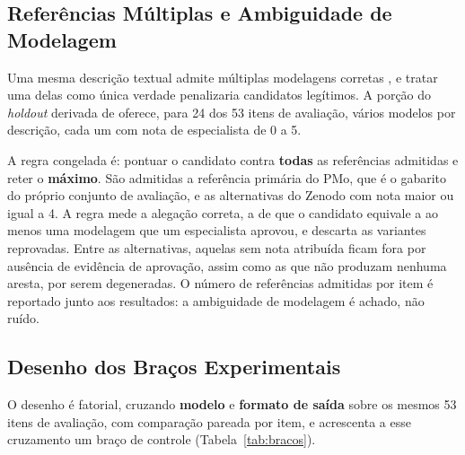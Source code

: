 \subsection{Referências Múltiplas e Ambiguidade de Modelagem}
\label{subsec:multi-referencia}

Uma mesma descrição textual admite múltiplas modelagens corretas \cite{vanderaa2018challenges}, e tratar uma delas como única verdade penalizaria candidatos legítimos. A porção do \textit{holdout} derivada de  oferece, para 24 dos 53 itens de avaliação, vários modelos por descrição, cada um com nota de especialista de 0 a 5.

A regra congelada é: pontuar o candidato contra \textbf{todas} as referências admitidas e reter o \textbf{máximo}. São admitidas a referência primária do PMo, que é o gabarito do próprio conjunto de avaliação, e as alternativas do Zenodo com nota maior ou igual a 4. A regra mede a alegação correta, a de que o candidato equivale a ao menos uma modelagem que um especialista aprovou, e descarta as variantes reprovadas. Entre as alternativas, aquelas sem nota atribuída ficam fora por ausência de evidência de aprovação, assim como as que não produzam nenhuma aresta, por serem degeneradas. O número de referências admitidas por item é reportado junto aos resultados: a ambiguidade de modelagem é achado, não ruído.

\subsection{Desenho dos Braços Experimentais}
\label{subsec:bracos}

O desenho é fatorial, cruzando \textbf{modelo} e \textbf{formato de saída} sobre os mesmos 53 itens de avaliação, com comparação pareada por item, e acrescenta a esse cruzamento um braço de controle (Tabela~\ref{tab:bracos}).

